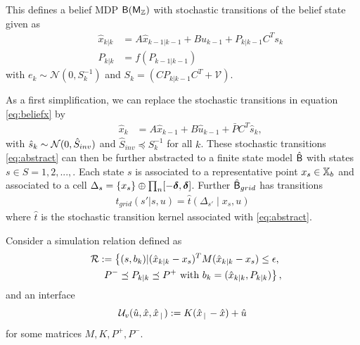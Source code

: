 \documentclass{ifacconf}
\begin{document}
This defines a belief MDP $\mathsf{B}{(\mathsf{M}_{{\mathbb{Z}}})}$ with stochastic transitions of the belief state given as 
\begin{align}
	&&\hat x_{k|k}&=A\hat x_{k-1|k-1}+Bu_{k-1}+P_{k|k-1}C^Ts_k\label{eq:beliefx}\\
	&&P_{k|k}&=f(P_{k-1|k-1})
\end{align}
with $e_k\sim \mathcal N (0, S_k^{-1})$ and  $S_k=\left(CP_{k|k-1}C^T+\mathcal V\right)$.

 
As a first simplification, we can replace the stochastic transitions  in equation \eqref{eq:beliefx} by
\begin{align}  
		&&\hat x_k &=A\hat x_{k-1} +B\hat u_{k-1} + \bar P  C^T  \hat{s}_k,\label{eq:abstract} 
\end{align}
with $ \hat{s}_k\sim \mathcal{N} (0,\hat{S}_{inv})$ and $\hat{S}_{inv}\preceq S_k^{-1}$ for all $k$.
These stochastic transitions \eqref{eq:abstract} can then be further abstracted to a finite state model $\hat{\mathsf{B}}$ with states $s\in S=1,2,..., $. Each state $s$ is associated to a representative point $x_s\in {{\mathbb{X}}_b}$ and associated to a 
cell $\Delta_s=\{x_s\} \oplus \prod_n [-\boldsymbol{\delta}, \boldsymbol{\delta}]$.
Further $\hat{\mathsf{B}}_{grid}$  has transitions 
\begin{align}\label{eq:tgrid}
t_{grid}(s'|s,u)=\hat t \left(\Delta_{s'}\mid x_s, u\right)
\end{align}where $\hat t$ is the stochastic transition kernel associated with \eqref{eq:abstract}.


Consider a simulation relation defined as 
	\begin{align}\label{eq:rel}
\mathcal{R} := \left\{(s,b_k)| (\hat x_{k|k}-x_s)^T M(\hat x_{k|k}-x_s)\leq \epsilon, \right.\\\qquad\left.  P^-\preceq P_{k|k} \preceq   P^+ \mbox{ with } b_k=(\hat x_{k|k}, P_{k|k} ) \right\},\notag
	\end{align}
and an interface 
\[\mathcal{U}_{v}(\hat u, \hat x, \hat x_{\,|\,}):=K( \hat x_{\,|\,} -\hat x)+\hat u\]
for some matrices $M, K,P^+,P^-$.
\end{document}
